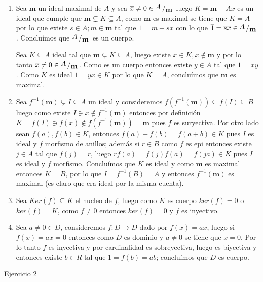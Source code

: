 \documentclass[11pt]{article}
\newcommand\mm{\mathbf{m}}
\newcommand{\quotient}[2]{{\raisebox{.2em}{$#1$}\left/\raisebox{-.2em}{$#2$}\right.}}
\newenvironment{proof}[1][Demostraci\'on]{\begin{trivlist}
		\item[\hskip \labelsep {\bfseries #1}]}{\end{trivlist}}
\newcommand{\qed}{\nobreak \ifvmode \relax \else
	\ifdim\lastskip<1.5em \hskip-\lastskip
	\hskip1.5em plus0em minus0.5em \fi \nobreak
	\vrule height0.75em width0.5em depth0.25em\fi}
\begin{document}
\begin{enumerate}
\begin{proof}
\begin{enumerate}
			\item Sea $\mm$ un ideal maximal de $A$ y sea $\overline{x} \neq 0 \in \quotient{A}{\mm}$ luego $K = \mm + Ax$ es un ideal que cumple que $\mm \subsetneq K \subseteq A$, como $\mm$ es maximal se tiene que $K = A$ por lo que existe $s \in A; m \in \mm$ tal que $1 = m + sx$ con lo que $\overline{1} = \overline{s}\overline{x} \in \quotient{A}{\mm}$. Conclu\'imos que $\quotient{A}{\mm}$ es un cuerpo.
			
			Sea $K \subseteq A$ ideal tal que $\mm \subsetneq K \subseteq A $, luego existe $x \in K, x \not \in \mm$ y por lo tanto $\overline{x} \neq 0 \in \quotient{A}{\mm}$. Como es un cuerpo entonces existe $y \in A$ tal que $\overline{1} = \overline{x}\overline{y}$. Como $K$ es ideal $1 = yx \in K$ por lo que $K=A$, conclu\'imos que $\mm$ es maximal.
			
			\item Sea $f^{-1}(\mm) \subsetneq I \subseteq A$ un ideal y consideremos $f(f^{-1}(\mm)) \subseteq f(I) \subseteq B$ luego como existe $I \ni x \not \in f^{-1}(\mm)$ entonces por definici\'on $K=f(I) \ni f(x) \not \in f(f^{-1}(\mm))= \mm$ pues $f$ es suryectiva. Por otro lado sean $f(a),f(b) \in K$, entonces $f(a) + f(b) = f(a+b) \in K$ pues $I$ es ideal y $f$ morfismo de anillos; adem\'as si $r \in B$ como $f$ es epi entonces existe $j \in A$ tal que $f(j)=r$, luego $rf(a) = f(j)f(a) = f(ja) \in K$ pues $I$ es ideal y $f$ morfismo. Conclu\'imos que $K$ es ideal y como $\mm$ es maximal entonces $K = B$, por lo que $I = f^{-1}(B) = A$ y entonces $f^{-1}(\mm)$ es maximal (es claro que era ideal por la misma cuenta).
			
			\item Sea $Ker(f) \subseteq K$ el nucleo de $f$, luego como $K$ es cuerpo $ker(f) = 0$ o $ker(f) = K$, como $f \neq 0$ entonces $ker(f) = 0$ y $f$ es inyectivo.
			
			\item Sea $a\neq 0 \in D$, consideremos $f : D \rightarrow D$ dado por $f(x) = ax$, luego si $f(x) = ax = 0$ entonces como $D$ es dominio y $a \neq 0$ se tiene que $x = 0$. Por lo tanto $f$ es inyectiva y por cardinalidad es sobreyectiva, luego es biyectiva y entonces existe $b \in R$ tal que $1 = f(b)= ab$; conclu\'imos que $D$ es cuerpo. \qed
			
		\end{enumerate}
		
	\end{proof}
	
	\item Ejercicio 2
	

\end{enumerate}
\end{document}
